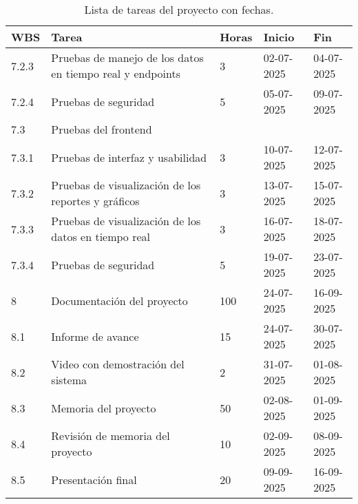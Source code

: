 \begin{table}[ht]
	\begin{tabularx}{\linewidth}{|p{1cm}|p{10cm}|p{1cm}|p{1.8cm}|p{1.8cm}|}
		\hline
		\rowcolor[HTML]{C0C0C0}
		WBS   & Tarea                                                     & Horas & Inicio     & Fin        \\ \hline
		7.2.3 & Pruebas de manejo de los datos en tiempo real y endpoints & 3     & 02-07-2025 & 04-07-2025 \\ \hline
		7.2.4 & Pruebas de seguridad                                      & 5     & 05-07-2025 & 09-07-2025 \\ \hline
		7.3   & Pruebas del frontend                                      &       &            &            \\ \hline
		7.3.1 & Pruebas de interfaz y usabilidad                          & 3     & 10-07-2025 & 12-07-2025 \\ \hline
		7.3.2 & Pruebas de visualización de los reportes y gráficos       & 3     & 13-07-2025 & 15-07-2025 \\ \hline
		7.3.3 & Pruebas de visualización de los datos en tiempo real      & 3     & 16-07-2025 & 18-07-2025 \\ \hline
		7.3.4 & Pruebas de seguridad                                      & 5     & 19-07-2025 & 23-07-2025 \\ \hline
		8     & Documentación del proyecto                                & 100   & 24-07-2025 & 16-09-2025 \\ \hline
		8.1   & Informe de avance                                         & 15    & 24-07-2025 & 30-07-2025 \\ \hline
		8.2   & Video con demostración del sistema                        & 2     & 31-07-2025 & 01-08-2025 \\ \hline
		8.3   & Memoria del proyecto                                      & 50    & 02-08-2025 & 01-09-2025 \\ \hline
		8.4   & Revisión de memoria del proyecto                          & 10    & 02-09-2025 & 08-09-2025 \\ \hline
		8.5   & Presentación final                                        & 20    & 09-09-2025 & 16-09-2025 \\ \hline
	\end{tabularx}
	\caption{Lista de tareas del proyecto con fechas.}
	\label{tab:tabGantt}
\end{table}

